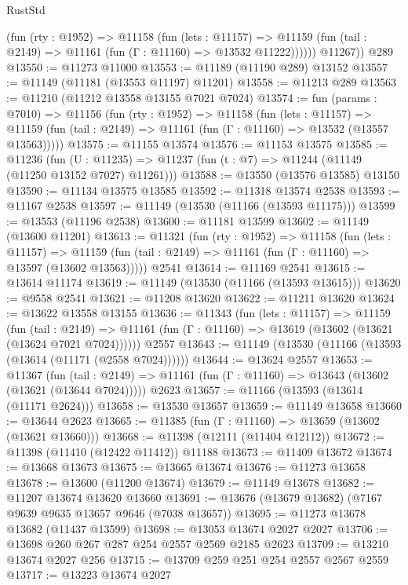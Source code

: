 \begin{lexlean}{RustStd}
\begin{coremodule}
            (fun (rty : @1952) =>
            @11158
              (fun (lets : @11157) =>
              @11159 (fun (tail : @2149) => @11161 (fun (Γ : @11160) => @13532 @11222))))))
        @11267))
    @289
@13550 := @11273 @11000
@13553 := @11189 (@11190 @289) @13152
@13557 := @11149 (@11181 (@13553 @11197) @11201)
@13558 := @11213 @289
@13563 := @11210 (@11212 @13558 @13155 @7021 @7024)
@13574 := fun (params : @7010) =>
  @11156
    (fun (rty : @1952) =>
    @11158
      (fun (lets : @11157) =>
      @11159 (fun (tail : @2149) => @11161 (fun (Γ : @11160) => @13532 (@13557 @13563)))))
@13575 := @11155 @13574
@13576 := @11153 @13575
@13585 := @11236
    (fun (U : @11235) => @11237 (fun (t : @7) => @11244 (@11149 (@11250 @13152 @7027) @11261)))
@13588 := @13550 (@13576 @13585) @13150
@13590 := @11134 @13575 @13585
@13592 := @11318 @13574 @2538
@13593 := @11167 @2538
@13597 := @11149 (@13530 (@11166 (@13593 @11175)))
@13599 := @13553 (@11196 @2538)
@13600 := @11181 @13599
@13602 := @11149 (@13600 @11201)
@13613 := @11321
    (fun (rty : @1952) =>
    @11158
      (fun (lets : @11157) =>
      @11159 (fun (tail : @2149) => @11161 (fun (Γ : @11160) => @13597 (@13602 @13563)))))
    @2541
@13614 := @11169 @2541
@13615 := @13614 @11174
@13619 := @11149 (@13530 (@11166 (@13593 @13615)))
@13620 := @9558 @2541
@13621 := @11208 @13620
@13622 := @11211 @13620
@13624 := @13622 @13558 @13155
@13636 := @11343
    (fun (lets : @11157) =>
    @11159
      (fun (tail : @2149) =>
      @11161 (fun (Γ : @11160) => @13619 (@13602 (@13621 (@13624 @7021 @7024))))))
    @2557
@13643 := @11149 (@13530 (@11166 (@13593 (@13614 (@11171 (@2558 @7024))))))
@13644 := @13624 @2557
@13653 := @11367
    (fun (tail : @2149) => @11161 (fun (Γ : @11160) => @13643 (@13602 (@13621 (@13644 @7024)))))
    @2623
@13657 := @11166 (@13593 (@13614 (@11171 @2624)))
@13658 := @13530 @13657
@13659 := @11149 @13658
@13660 := @13644 @2623
@13665 := @11385 (fun (Γ : @11160) => @13659 (@13602 (@13621 @13660)))
@13668 := @11398 (@12111 (@11404 @12112))
@13672 := @11398 (@11410 (@12422 @11412)) @11188
@13673 := @11409 @13672
@13674 := @13668 @13673
@13675 := @13665 @13674
@13676 := @11273 @13658
@13678 := @13600 (@11200 @13674)
@13679 := @11149 @13678
@13682 := @11207 @13674 @13620 @13660
@13691 := @13676 (@13679 @13682) (@7167 @9639 @9635 @13657 @9646 (@7038 @13657))
@13695 := @11273 @13678 @13682 (@11437 @13599)
@13698 := @13053 @13674 @2027 @2027
@13706 := @13698 @260 @267 @287 @254 @2557 @2569 @2185 @2623
@13709 := @13210 @13674 @2027 @256
@13715 := @13709 @259 @251 @254 @2557 @2567 @2559
@13717 := @13223 @13674 @2027

\end{coremodule}
\end{lexlean}
